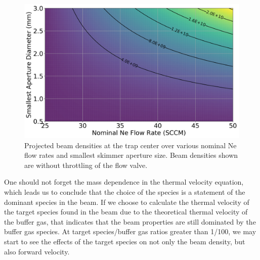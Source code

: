 \begin{figure}[H]
	\centering
	\includegraphics[width=1\textwidth]{images/CBGB_trap_density_aperture.png}
	\caption{Projected beam densities at the trap center over various nominal Ne flow rates and smallest skimmer aperture size. Beam densities shown are without throttling of the  flow valve.}
	\label{fig: trap_density}
\end{figure}

One should not forget the mass dependence in the thermal velocity equation, which leads us to conclude that the choice of the species is a statement of the dominant species in the beam. If we choose to calculate the thermal velocity of the target species found in the beam due to the theoretical thermal velocity of the buffer gas, that indicates that the beam properties are still dominated by the buffer gas species. At target species/buffer gas ratios greater than 1/100, we may start to see the effects of the target species on not only the beam density, but also forward velocity.